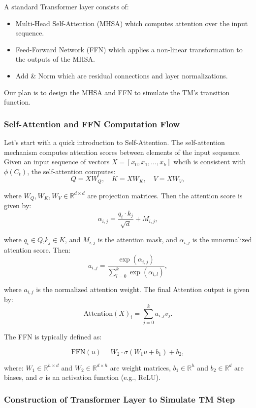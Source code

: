{A standard Transformer layer consists of:

\begin{itemize}
    \item Multi-Head Self-Attention (MHSA) which computes attention over the input sequence.
    \item Feed-Forward Network (FFN) which applies a non-linear transformation to the outputs of the MHSA.
    \item Add \& Norm which are residual connections and layer normalizations.
\end{itemize}

Our plan is to design the MHSA and FFN to simulate the TM's transition function. 


\subsubsection{Self-Attention and FFN Computation Flow}
Let's start with a quick introduction to Self-Attention.
The self-attention mechanism computes attention scores between elements of the input sequence. Given an input sequence of vectors \( X = [x_0, x_1, \dots, x_k] \) whcih is consistent with \(\phi(C_t)\), the self-attention computes: \[
   Q = X W_Q, \quad K = X W_K, \quad V = X W_V,
   \]

   where \( W_Q, W_K, W_V \in \mathbb{R}^{d \times d} \) are projection matrices. Then the attention score is given by: \[
   \alpha_{i,j} = \frac{q_i \cdot k_j}{\sqrt{d}} + M_{i,j},
   \]

   where \(q_i \in Q\),\(k_j\in K\), and \( M_{i,j} \) is the attention mask, and \( \alpha_{i,j} \) is the unnormalized attention score. Then: 
   \[
   a_{i,j} = \frac{\exp(\alpha_{i,j})}{\sum_{l=0}^k \exp(\alpha_{i,l})},
   \]

   where \( a_{i,j} \) is the normalized attention weight. The final Attention output is given by:
 \[
   \text{Attention}(X)_i = \sum_{j=0}^k a_{i,j} v_j.
   \]

The FFN is typically defined as:

\[
\text{FFN}(u) = W_2 \cdot \sigma(W_1 u + b_1) + b_2,
\]

where: \( W_1 \in \mathbb{R}^{h \times d} \) and \( W_2 \in \mathbb{R}^{d \times h} \) are weight matrices, \( b_1 \in \mathbb{R}^{h} \) and \( b_2 \in \mathbb{R}^{d} \) are biases, and \( \sigma \) is an activation function (e.g., ReLU).
   
\subsubsection{Construction of Transformer Layer to Simulate TM Step}

}
